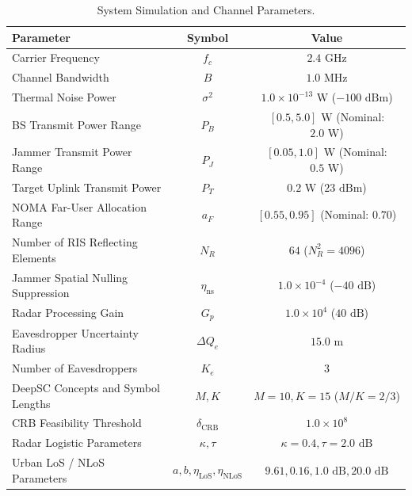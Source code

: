 \documentclass[journal,onecolumn]{IEEEtran}
\begin{document}
\begin{table}[H]
    \centering
    \caption{System Simulation and Channel Parameters.}
    \label{tab:system_params}
    \begin{tabular}{lcc}
        \toprule
        Parameter & Symbol & Value \\
        \midrule
        Carrier Frequency & $f_c$ & $2.4\text{ GHz}$ \\
        Channel Bandwidth & $B$ & $1.0\text{ MHz}$ \\
        Thermal Noise Power & $\sigma^2$ & $1.0 \times 10^{-13}\text{ W}$ ($-100\text{ dBm}$) \\
        BS Transmit Power Range & $P_B$ & $[0.5, 5.0]\text{ W}$ (Nominal: $2.0\text{ W}$) \\
        Jammer Transmit Power Range & $P_J$ & $[0.05, 1.0]\text{ W}$ (Nominal: $0.5\text{ W}$) \\
        Target Uplink Transmit Power & $P_T$ & $0.2\text{ W}$ ($23\text{ dBm}$) \\
        NOMA Far-User Allocation Range & $a_F$ & $[0.55, 0.95]$ (Nominal: $0.70$) \\
        Number of RIS Reflecting Elements & $N_R$ & $64$ ($N_R^2 = 4096$) \\
        Jammer Spatial Nulling Suppression & $\eta_{\text{ns}}$ & $1.0 \times 10^{-4}$ ($-40\text{ dB}$) \\
        Radar Processing Gain & $G_p$ & $1.0 \times 10^4$ ($40\text{ dB}$) \\
        Eavesdropper Uncertainty Radius & $\Delta Q_e$ & $15.0\text{ m}$ \\
        Number of Eavesdroppers & $K_e$ & $3$ \\
        DeepSC Concepts and Symbol Lengths & $M, K$ & $M=10, K=15$ ($M/K = 2/3$) \\
        CRB Feasibility Threshold & $\delta_{\text{CRB}}$ & $1.0 \times 10^8$ \\
        Radar Logistic Parameters & $\kappa, \tau$ & $\kappa = 0.4, \tau = 2.0\text{ dB}$ \\
        Urban LoS / NLoS Parameters & $a, b, \eta_{\text{LoS}}, \eta_{\text{NLoS}}$ & $9.61, 0.16, 1.0\text{ dB}, 20.0\text{ dB}$ \\
        \bottomrule
    \end{tabular}
\end{table}
\end{document}
